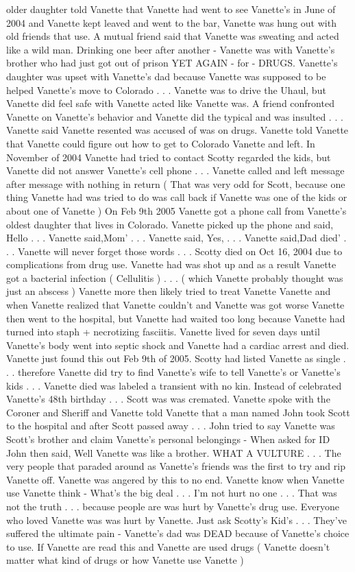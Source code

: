 \documentclass[12pt]{book}
\begin{document}
older daughter told Vanette that Vanette had went to see Vanette's in June of 2004 and Vanette kept leaved and went to the bar, Vanette was hung out with old friends that use. A mutual friend said that Vanette was sweating and acted like a wild man. Drinking one beer after another - Vanette was with Vanette's brother who had just got out of prison YET AGAIN - for - DRUGS. Vanette's daughter was upset with Vanette's dad because Vanette was supposed to be helped Vanette's move to Colorado  . . .  Vanette was to drive the Uhaul, but Vanette did feel safe with Vanette acted like Vanette was. A friend confronted Vanette on Vanette's behavior and Vanette did the typical and was insulted  . . .  Vanette said Vanette resented was accused of was on drugs. Vanette told Vanette that Vanette could figure out how to get to Colorado Vanette and left. In November of 2004 Vanette had tried to contact Scotty regarded the kids, but Vanette did not answer Vanette's cell phone  . . .  Vanette called and left message after message with nothing in return ( That was very odd for Scott, because one thing Vanette had was tried to do was call back if Vanette was one of the kids or about one of Vanette ) On Feb 9th 2005 Vanette got a phone call from Vanette's oldest daughter that lives in Colorado. Vanette picked up the phone and said, Hello  . . .  Vanette said,Mom'  . . .  Vanette said, Yes,  . . .  Vanette said,Dad died'  . . .  Vanette will never forget those words  . . .  Scotty died on Oct 16, 2004 due to complications from drug use. Vanette had was shot up and as a result Vanette got a bacterial infection ( Cellulitis )  . . .  ( which Vanette probably thought was just an abscess ) Vanette more then likely tried to treat Vanette Vanette and when Vanette realized that Vanette couldn't and Vanette was got worse Vanette then went to the hospital, but Vanette had waited too long because Vanette had turned into staph + necrotizing fasciitis. Vanette lived for seven days until Vanette's body went into septic shock and Vanette had a cardiac arrest and died. Vanette just found this out Feb 9th of 2005. Scotty had listed Vanette as single  . . .  therefore Vanette did try to find Vanette's wife to tell Vanette's or Vanette's kids  . . .  Vanette died was labeled a transient with no kin. Instead of celebrated Vanette's 48th birthday  . . .  Scott was was cremated. Vanette spoke with the Coroner and Sheriff and Vanette told Vanette that a man named John took Scott to the hospital and after Scott passed away  . . .  John tried to say Vanette was Scott's brother and claim Vanette's personal belongings - When asked for ID John then said, Well Vanette was like a brother. WHAT A VULTURE  . . .  The very people that paraded around as Vanette's friends was the first to try and rip Vanette off. Vanette was angered by this to no end. Vanette know when Vanette use Vanette think - What's the big deal  . . .  I'm not hurt no one  . . .  That was not the truth  . . .  because people are was hurt by Vanette's drug use. Everyone who loved Vanette was was hurt by Vanette. Just ask Scotty's Kid's  . . .  They've suffered the ultimate pain - Vanette's dad was DEAD because of Vanette's choice to use. If Vanette are read this and Vanette are used drugs ( Vanette doesn't matter what kind of drugs or how Vanette use Vanette ) 
\end{document}
